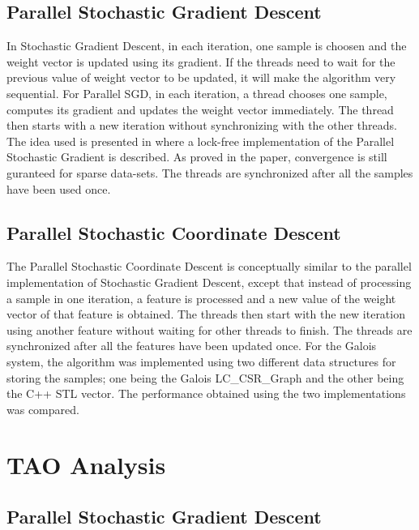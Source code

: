 \documentclass{sigplanconf}
\begin{document}
\subsection{Parallel Stochastic Gradient Descent}
In Stochastic Gradient Descent, in each iteration, one sample is choosen and the weight vector is updated using its gradient. 
If the threads need to wait for the previous value of weight vector to be updated, it will make the algorithm very sequential. For Parallel SGD, in each iteration, a thread chooses one sample, computes its gradient and updates the weight vector immediately. The thread then starts with a new iteration without synchronizing with the other threads. The idea used is presented in \cite{rich1} where a lock-free implementation of the Parallel Stochastic Gradient is described. As proved in the paper, convergence is still guranteed for sparse data-sets. The threads are synchronized after all the samples have been used once.


\subsection{Parallel Stochastic Coordinate Descent}
The Parallel Stochastic Coordinate Descent is conceptually similar to the parallel implementation of Stochastic Gradient Descent, except that instead of
processing a sample in one iteration, a feature is processed and a new value of the weight vector of that feature is obtained. The threads then start with
the new iteration using another feature without waiting for other threads to finish. The threads are synchronized after all the features have been
updated once. For the Galois system, the algorithm was implemented using two different data structures for storing the samples; one being the 
Galois LC\_CSR\_Graph and the other being the C++ STL vector. The performance obtained using the two implementations was compared.

\section{TAO Analysis}
\subsection{Parallel Stochastic Gradient Descent}
\end{document}
